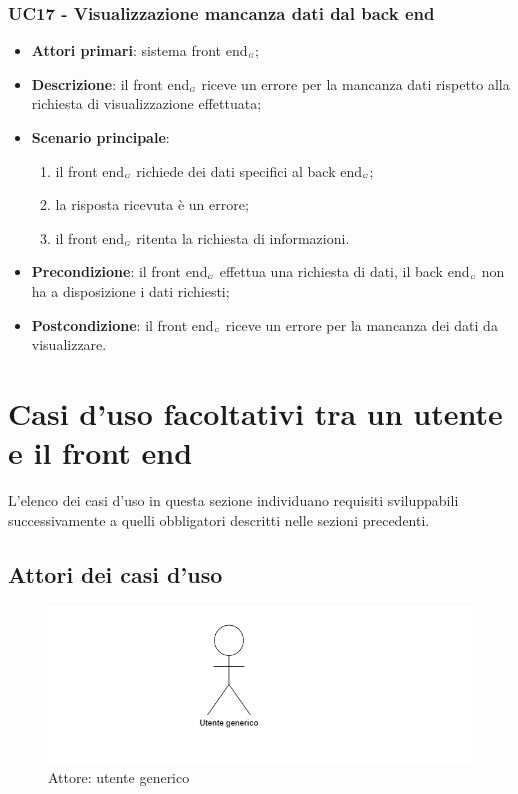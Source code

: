 \subsubsection{UC17 - Visualizzazione mancanza dati dal back end}\label{CasiDUsoCasiDUsoTraIlFrontEndEIlBackEndElencoDeiCasiDUsoUC9VisualizzazioneMessaggioDiMancanzaDatiDalBackEnd}
\begin{itemize}
	\item \textbf{Attori primari}: sistema front end$_{\scaleto{G}{3pt}}$;
	\item \textbf{Descrizione}: il front end$_{\scaleto{G}{3pt}}$ riceve un errore per la mancanza dati rispetto alla richiesta di visualizzazione effettuata;
	\item \textbf{Scenario principale}:
	\begin{enumerate}
		\item il front end$_{\scaleto{G}{3pt}}$ richiede dei dati specifici al back end$_{\scaleto{G}{3pt}}$;
		\item la risposta ricevuta è un errore;
		\item il front end$_{\scaleto{G}{3pt}}$ ritenta la richiesta di informazioni.
	\end{enumerate}
	\item \textbf{Precondizione}: il front end$_{\scaleto{G}{3pt}}$ effettua una richiesta di dati, il back end$_{\scaleto{G}{3pt}}$ non ha a disposizione i dati richiesti;
	\item \textbf{Postcondizione}: il front end$_{\scaleto{G}{3pt}}$ riceve un errore per la mancanza dei dati da visualizzare.
\end{itemize}

\newpage
\section{Casi d'uso facoltativi tra un utente e il front end}\label{CasiDUsoCasiDUsoFacoltativiTraUnUtenteEIlFrontEnd}
L'elenco dei casi d'uso in questa sezione individuano requisiti sviluppabili successivamente a quelli obbligatori descritti nelle sezioni precedenti.
\subsection{Attori dei casi d'uso}
\begin{center}
	\begin{figure}[H]
		\centering\includegraphics{../immagini/attori_casi/utente_generico.png}
		\caption{Attore: utente generico}
	\end{figure}
\end{center}
